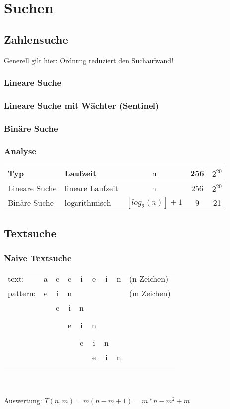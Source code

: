 \documentclass[a4paper,10pt]{article}
\begin{document}
\section{Suchen}
\subsection{Zahlensuche}
Generell gilt hier: Ordnung reduziert den Suchaufwand!
\subsubsection{Lineare Suche}

\subsubsection{Lineare Suche mit W\"{a}chter (Sentinel)}

\subsubsection{Bin\"are Suche}


\subsubsection{Analyse}
\begin{tabular}{l | l | c | c | c }
	Typ & Laufzeit & n & 256 & $2^{20}$ \\
	\hline
	Lineare Suche & lineare Laufzeit & n & 256 & $2^{20}$ \\
	Bin\"are Suche & logarithmisch & $[log_{2}(n)]+1$ & 9 & 21
\end{tabular}

\subsection{Textsuche}
\subsubsection{Naive Textsuche}
\begin{tabular}{l c c c c c c c l}
	text: & a & e & e & i & e & i & n & (n Zeichen) \\
	pattern: & e & i & n & & & & & (m Zeichen) \\
	& \lightning & e & i & n \\
	& & \checkmark & \lightning \\
	& & & e & i & n \\
	& & & \checkmark & \checkmark & \lightning \\
	& & & & e & i & n \\
	& & & & \lightning & e & i & n \\
	& & & & & \checkmark & \checkmark & \checkmark \\
\end{tabular} \\ \\
Auswertung: $T(n,m) = m(n-m+1)=m*n-m^2+m$
\end{document}
